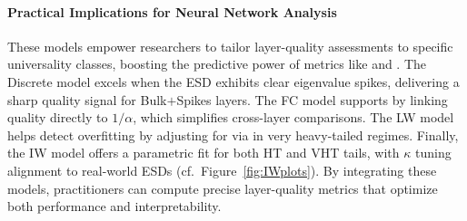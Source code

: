 \paragraph{Practical Implications for Neural Network Analysis}
These models empower researchers to tailor layer-quality assessments to specific \HTSR universality classes, boosting the predictive power of \WW metrics like \ALPHA and \ALPHAHAT. The Discrete model excels when the ESD exhibits clear eigenvalue spikes, delivering a sharp quality signal for Bulk$+$Spikes layers. The FC model supports \IdealLearning by linking quality directly to \(1/\alpha\), which simplifies cross-layer comparisons. The LW model helps detect overfitting by adjusting for \CorrelationTraps via \ALPHAHAT in very heavy-tailed regimes. Finally, the IW model offers a parametric fit for both HT and VHT tails, with \(\kappa\) tuning alignment to real-world ESDs (cf.\ Figure~\ref{fig:IWplots}). By integrating these models, practitioners can compute precise layer-quality metrics that optimize both performance and interpretability.
